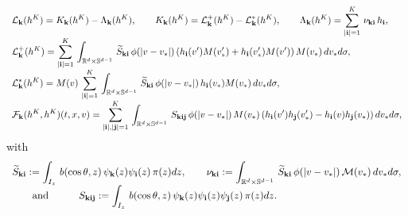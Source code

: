 \documentclass[final,onefignum,onetabnum]{siamart171218}
\def\bk{{\bf{k}}}
\def\bi{{\bf{i}}}
\def\bj{{\bf{j}}}
\begin{document}
\begin{align}
\begin{array}{l}
\label{LFK}
\displaystyle \mathcal L_{\bk}(h^K)=K_{\bk}(h^K)-\Lambda_{\bk}(h^K), \qquad
K_{\bk}(h^K)=\mathcal L^{+}_{\bk}(h^K) -\mathcal L^{\ast}_{\bk}(h^K), \qquad
\Lambda_{\bk}(h^K)=\sum_{|\bi|=1}^{K}\, \nu_{\bk\bi}\, h_{\bi}, \\[1pt]
\displaystyle \mathcal L^{+}_{\bk}(h^K)=\sum_{|\bi|=1}^{K}\,\int_{\mathbb R^d\times\mathbb S^{d-1}}\,\widetilde S_{\bk\bi}\,
 \phi(|v-v_{\ast}|)\, (h_{\bi}(v^{\prime}) M(v_{\ast}^{\prime}) + h_{\bi}(v_{\ast}^{\prime})M(v^{\prime}))\, M(v_{\ast})\, dv_{\ast}d\sigma, \\[1pt]
 \displaystyle \mathcal L^{\ast}_{\bk}(h^K) = M(v)\, \sum_{|\bi|=1}^{K}\,\int_{\mathbb R^d\times\mathbb S^{d-1}}\, \widetilde S_{\bk\bi}\,
 \phi(|v-v_{\ast}|)\, h_{\bi}(v_{\ast}) M(v_{\ast})\, dv_{\ast}d\sigma, \\[1pt]
\displaystyle \mathcal F_{\bk}(h^K, h^K) (t,x,v)=\sum_{|\bi|, |\bj|=1}^{K}\,\int_{\mathbb R^d\times\mathbb S^{d-1}}\, S_{\bk\bi\bj}\,
\phi(|v-v_{\ast}|)\, M(v_{\ast})\, (h_{\bi}(v^{\prime})h_{\bj}(v_{\ast}^{\prime}) - h_{\bi}(v)h_{\bj}(v_{\ast}))\, dv_{\ast}d\sigma,
\end{array}
\end{align}
with
\begin{align*}
\begin{array}{l}
\displaystyle\widetilde S_{\bk\bi}:=\int_{I_z}\, b(\cos\theta,z)\, \psi_{\bk}(z)\psi_{\bi}(z)\, \pi(z)dz, \qquad
\nu_{\bk\bi}:=\int_{\mathbb R^d\times\mathbb S^{d-1}}\, \widetilde S_{\bk\bi}\, \phi(|v-v_{\ast}|)\, \mathcal M(v_{\ast})\, dv_{\ast}d\sigma,  \\[2pt]
\displaystyle \qquad\text{and}\qquad\quad S_{\bk\bi\bj}:=\int_{I_z}\,  b(\cos\theta,z)\, \psi_{\bk}(z)\psi_{\bi}(z)\psi_{\bj}(z)\, \pi(z)dz.
\end{array}
\end{align*}

\end{document}
